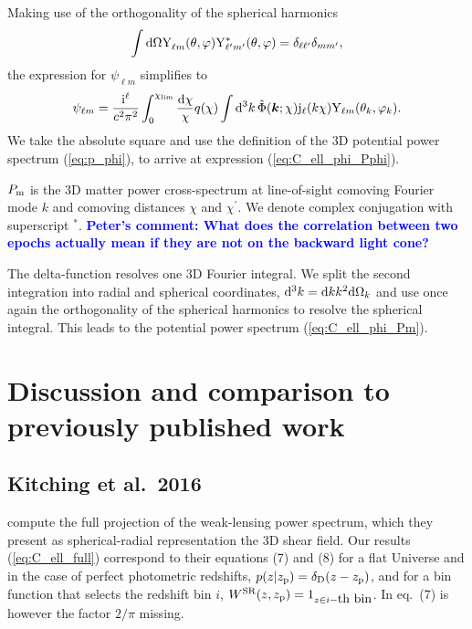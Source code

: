\documentclass[fleqn,usenatbib]{mnras} %
\renewcommand{\vec}{\bm}
\newcommand{\mk}[1]{{\bf\textcolor{blue}{#1}}}
\begin{document}
\begin{appendix}
Making use of the orthogonality of the spherical harmonics
%
%
\begin{equation}
  \int {\rm d} \Omega {\rm Y}^{}_{\ell m}(\theta, \varphi) {\rm Y}^\ast_{\ell^\prime m^\prime}(\theta, \varphi) = \delta_{\ell \ell^\prime} \delta_{m m^\prime},
  \label{eq:Yellm_ortho}
\end{equation}
%
the expression for $\psi_{\ell m}$ simplifies to
%
\begin{equation}
  \psi_{\ell m} = \frac {{\rm i}^\ell}{c^2 \pi^2} \int_0^{\chi_{\rm lim}} \frac{{\rm d}\chi}{\chi} q(\chi) \int {\rm d}^3 k \,
    \hat \Phi(\vec k; \chi) {\rm j}_\ell(k \chi) {\rm Y}_{\ell m}(\theta_k, \varphi_k).
  \label{eq:psi_ellm}
\end{equation}
%
We take the absolute square and use the definition of the 3D potential power spectrum (\ref{eq:p_phi}),
to arrive at expression (\ref{eq:C_ell_phi_Pphi}).

$P_{\rm m}$ is the 3D matter power cross-spectrum at line-of-sight comoving
Fourier mode $k$ and comoving distances $\chi$ and $\chi^\prime$. We denote
complex conjugation with superscript $^\ast$.
\mk{Peter's comment: What does the correlation between two epochs actually mean if they
are not on the backward light cone?}

The delta-function resolves one 3D Fourier
integral. We split the second integration into radial and spherical
coordinates, ${\rm d}^3 k = {\rm d} k k^2 {\rm d} \Omega_k$ and use once again
the orthogonality of the spherical harmonics to resolve the spherical integral. 
This leads to the potential power spectrum (\ref{eq:C_ell_phi_Pm}).




\section{Discussion and comparison to previously published work}

\subsection{Kitching et al.~2016}

\cite{2016arXiv161104954K} compute the full projection of the weak-lensing power
spectrum, which they present as spherical-radial representation the 3D shear field.
Our results (\ref{eq:C_ell_full}) correspond to their equations (7) and (8)
for a flat Universe and in the case of perfect
photometric redshifts, $p(z | z_{\rm p}) = \delta_{\rm D}(z - z_{\rm p})$, and
for a bin function that selects the redshift bin $i$, $W^{\rm SR}(z, z_{\rm p})
= 1_{z \in i-\mbox{th bin}}$. In \cite{2016arXiv161104954K} eq.~(7) is however the
factor $2/\pi$ missing.


\end{appendix}
\end{document}
